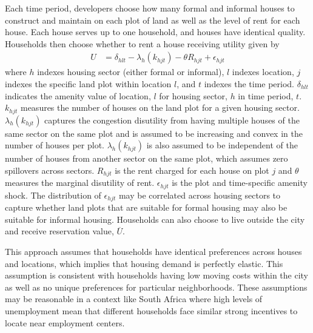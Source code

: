 \documentclass[12pt]{article}
\begin{document}


Each time period, developers choose how many formal and informal houses to construct and maintain on each plot of land as well as the level of rent for each house.  Each house serves up to one household, and houses have identical quality.  Households then choose whether to rent a house receiving utility given by
\begin{align*}
U &= \delta_{hlt} - \lambda_{h}(k_{hjt}) - \theta R_{hjt}   + \epsilon_{hjt}  
\end{align*}
\noindent where $h$ indexes housing sector (either formal or informal), $l$ indexes location, $j$ indexes the specific land plot within location $l$, and $t$ indexes the time period.  $\delta_{hlt}$ indicates the amenity value of location, $l$ for housing sector, $h$ in time period, $t$.  $k_{hjt}$ measures the number of houses on the land plot for a given housing sector.  $\lambda_{h}(k_{hjt})$ captures the congestion disutility from having multiple houses of the same sector on the same plot and is assumed to be increasing and convex in the number of houses per plot.   $\lambda_{h}(k_{hjt})$ is also assumed to be independent of the number of houses from another sector on the same plot, which assumes zero spillovers across sectors.    $R_{hjt}$ is the rent charged for each house on plot $j$ and $\theta$ measures the marginal disutility of rent.  $\epsilon_{hjt}$ is the plot and time-specific amenity shock.  The distribution of $\epsilon_{hjt}$ may be correlated across housing sectors to capture whether land plots that are suitable for formal housing may also be suitable for informal housing.  Households can also choose to live outside the city and receive reservation value, $\overline{U}$.  

This approach assumes that households have identical preferences across houses and locations, which implies that housing demand is perfectly elastic.  This assumption is consistent with households having low moving costs within the city as well as no unique preferences for particular neighborhoods.  These assumptions may be reasonable in a context like South Africa where high levels of unemployment mean that different households face similar strong incentives to locate near employment centers.
 
\end{document}
